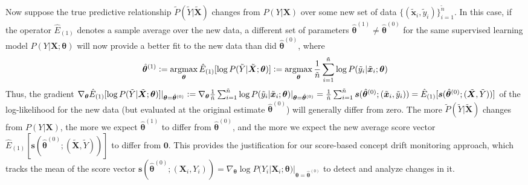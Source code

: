 \documentclass[twoside,11pt]{article}
\DeclareMathOperator*{\argmax}{argmax} %
\begin{document}
Now suppose the true predictive relationship $\tilde{P}(\tilde{Y}|\tilde{\bm{X}})$ changes from $P(Y|\bm{X})$ over some new set of data $\{(\tilde{\bm{x}}_i, \tilde{y}_i)\}_{i=1}^{\tilde{n}}$. In this case, if the operator $\hat{E}_{(1)}$ denotes a sample average over the new data, a different set of parameters $\hat{\bm{\theta}}^{(1)} \neq \hat{\bm{\theta}}^{(0)}$ for the same supervised learning model $P(Y|\bm{X};\bm{\theta})$ will now provide a better fit to the new data than did $\hat{\bm{\theta}}^{(0)}$, where 
\begin{align}
\begin{aligned}
\hat{\bm{\theta}}^{(1)} \vcentcolon= \argmax_{\bm{\theta}}\hat{E}_{(1)}[\log{P(\tilde{Y}|\tilde{\bm{X}}; \bm{\theta})}] \vcentcolon= \argmax_{\bm{\theta}}\frac{1}{\tilde{n}}\sum_{i=1}^{\tilde{n}} \log{P(\tilde{y}_i|\tilde{\bm{x}}_i;\bm{\theta})}
\end{aligned}
\label{eqn:score_exp_nonzero_emp}
\end{align}   
Thus, the gradient $\nabla_{\bm{\theta}}\hat{E}_{(1)}[\log{P(\tilde{Y} | \tilde{\bm{X}}; {\bm{\theta}})}]|_{\bm{\theta}=\hat{\bm{\theta}}^{(0)}} \vcentcolon= \nabla_{\bm{\theta}}\frac{1}{\tilde{n}}\sum_{i=1}^{\tilde{n}} \log{P(\tilde{y}_i | \tilde{\bm{x}}_i; {\bm{\theta}})}|_{\bm{\theta}=\hat{\bm{\theta}}^{(0)}} = \\ \frac{1}{\tilde{n}} \sum_{i=1}^{\tilde{n}} \bm{s}(\hat{\bm{\theta}}^{(0)};(\tilde{\bm{x}}_i, \tilde{y}_i)) = \hat{E}_{(1)}[\bm{s}(\hat{\bm{\theta}}^{(0)};(\tilde{\bm{X}}, \tilde{Y}))]$ of the log-likelihood for the new data (but evaluated at the original estimate $\hat{\bm{\theta}}^{(0)}$) will generally differ from zero. The more $\tilde{P}(\tilde{Y}|\tilde{\bm{X}})$ changes from $P(Y|\bm{X})$, the more we expect $\hat{\bm{\theta}}^{(1)}$ to differ from $\hat{\bm{\theta}}^{(0)}$, and the more we expect the new average score vector $\hat{E}_{(1)}[\bm{s}(\hat{\bm{\theta}}^{(0)};(\tilde{\bm{X}}, \tilde{Y}))]$ to differ from $\bm{0}$. This provides the justification for our score-based concept drift monitoring approach, which tracks the mean of the score vector $\bm{s}(\hat{\bm{\theta}}^{(0)};(\bm{X}_i, Y_i)) = \nabla_{\bm{\theta}}\log P(Y_i|\bm{X}_i; \bm{\theta})|_{\bm{\theta}=\hat{\bm{\theta}}^{(0)}}$ to detect and analyze changes in it. 
\end{document}
